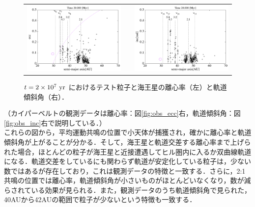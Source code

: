 \documentclass[11pt,a4paper,oneside,onecolumn]{jreport}
\begin{document}
\begin{figure}[H]
\begin{tabular}{ccc}
\begin{minipage}[t]{0.45\hsize}
\centering
\includegraphics[width=8cm]{./image/kuiper_ecc_20Myr.pdf}
\end{minipage} &
\begin{minipage}[t]{0.1\hsize}
\end{minipage} &
\begin{minipage}[t]{0.45\hsize}
\centering
\includegraphics[width=8cm]{./image/kuiper_inc_20Myr.pdf}
\end{minipage}\\
%
\end{tabular}
\caption{$t = 2 \times 10^7\ {\rm yr}$ におけるテスト粒子と海王星の離心率（左）と軌道傾斜角（右）．\label{fig:kuiper_ecc_inc_20Myr}}
\end{figure}

（カイパーベルトの観測データは離心率：図\ref{fig:obs_ecc}右，軌道傾斜角：図\ref{fig:obs_inc}右で説明している．）
\\

これらの図から，平均運動共鳴の位置で小天体が捕獲され，確かに離心率と軌道傾斜角が上がることが分かる．そして，海王星と軌道交差する離心率まで上げられた場合，ほとんどの粒子が海王星と近接遭遇してヒル圏内に入るか双曲線軌道になる．軌道交差をしているにも関わらず軌道が安定化している粒子は，少ない数ではあるが存在しており，これは観測データの特徴と一致する．さらに，2:1共鳴の位置では離心率，軌道傾斜角が小さいものがほとんどいなくなり，数が減らされている効果が見られる．また，観測データのうち軌道傾斜角で見られた，40AUから42AUの範囲で粒子が少ないという特徴も一致する．
\end{document}
